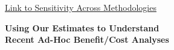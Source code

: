 \documentclass[static]{JJH-Beamer}
\begin{document}
\begin{frame}
\hypertarget{ret:across}{}

\begin{center}
\hyperlink{across}{\underline{Link to Sensitivity Across Methodologies}}
\end{center}

\end{frame}

\begin{frame}

\begin{center}
\textbf{Using Our Estimates to Understand\\ Recent Ad-Hoc Benefit/Cost Analyses}
\end{center}

\end{frame}
\end{document}
